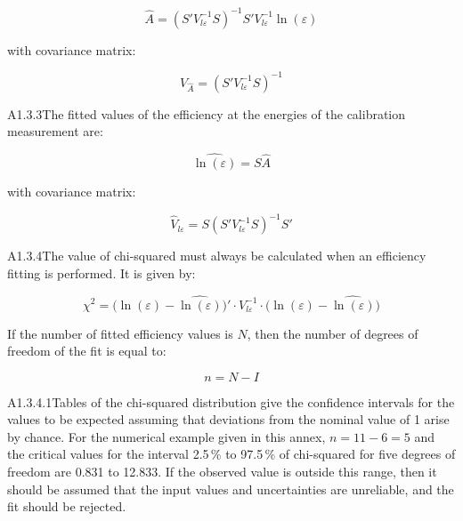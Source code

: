 \documentclass[12pt]{article}
\begin{document}
\begin{equation}
  \hat{A} = (S'V_{l\varepsilon}^{-1}S)^{-1}S'V_{l\varepsilon}^{-1}\ln(\varepsilon)
  \tag{A1.6}
  \label{eq:A1.6}
\end{equation}

\noindent with covariance matrix:

\begin{equation}
  V_{\hat{A}} = (S'V_{l\varepsilon}^{-1}S)^{-1}
  \tag{A1.7}
  \label{eq:A1.7}
\end{equation}

A1.3.3\quad The fitted values of the efficiency at the energies of the calibration
measurement are:

\begin{equation}
  \widehat{\ln(\varepsilon)} = S\hat{A}
  \tag{A1.8}
  \label{eq:A1.8}
\end{equation}

\noindent with covariance matrix:

\begin{equation}
  \hat{V}_{l\varepsilon} = S(S'V_{l\varepsilon}^{-1}S)^{-1}S'
  \tag{A1.9}
  \label{eq:A1.9}
\end{equation}

A1.3.4\quad The value of chi-squared must always be calculated when an efficiency fitting
is performed. It is given by:

\begin{equation}
  \chi^2 = \bigl(\ln(\varepsilon) - \widehat{\ln(\varepsilon)}\bigr)'
           \cdot V_{l\varepsilon}^{-1}
           \cdot \bigl(\ln(\varepsilon) - \widehat{\ln(\varepsilon)}\bigr)
  \tag{A1.10}
  \label{eq:A1.10}
\end{equation}

If the number of fitted efficiency values is $N$, then the number of degrees of freedom
of the fit is equal to:

\begin{equation}
  n = N - I
  \tag{A1.11}
  \label{eq:A1.11}
\end{equation}

A1.3.4.1\quad Tables of the chi-squared distribution give the confidence intervals for
the values to be expected assuming that deviations from the nominal value of 1 arise by
chance. For the numerical example given in this annex, $n = 11 - 6 = 5$ and the critical
values for the interval 2.5\,\% to 97.5\,\% of chi-squared for five degrees of freedom
are 0.831 to 12.833. If the observed value is outside this range, then it should be
assumed that the input values and uncertainties are unreliable, and the fit should be
rejected.
\end{document}

